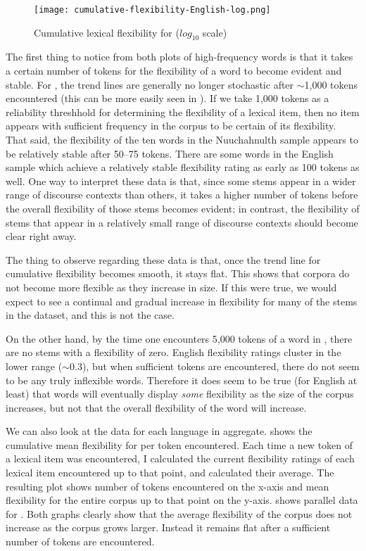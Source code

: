 \begin{figure}[h!]
  \centering
  \caption{Cumulative lexical flexibility for  ($log_10$ scale)}
  \label{fig:cumulative-flexibility-English-log}
  \texttt{[image: cumulative-flexibility-English-log.png]}
\end{figure}

The first thing to notice from both plots of high-frequency words is that it takes a certain number of tokens for the flexibility of a word to become evident and stable. For , the trend lines are generally no longer stochastic after $\sim$1,000 tokens encountered (this can be more easily seen in ). If we take 1,000 tokens as a reliability threshhold for determining the flexibility of a lexical item, then no  item appears with sufficient frequency in the corpus to be certain of its flexibility. That said, the flexibility of the ten words in the Nuuchahnulth sample appears to be relatively stable after 50–75 tokens. There are some words in the English sample which achieve a relatively stable flexibility rating as early as 100 tokens as well. One way to interpret these data is that, since some stems appear in a wider range of discourse contexts than others, it takes a higher number of tokens before the overall flexibility of those stems becomes evident; in contrast, the flexibility of stems that appear in a relatively small range of discourse contexts should become clear right away.

The thing to observe regarding these data is that, once the trend line for cumulative flexibility becomes smooth, it stays flat. This shows that corpora do not become more flexible as they increase in size. If this were true, we would expect to see a continual and gradual increase in flexibility for many of the stems in the dataset, and this is not the case.

On the other hand, by the time one encounters 5,000 tokens of a word in , there are no stems with a flexibility of zero. English flexibility ratings cluster in the lower range ($\sim0.3$), but when sufficient tokens are encountered, there do not seem to be any truly inflexible words. Therefore it does seem to be true (for English at least) that words will eventually display \emph{some} flexibility as the size of the corpus increases, but not that the overall flexibility of the word will increase.

We can also look at the data for each language in aggregate.  shows the cumulative mean flexibility for  per token encountered. Each time a new token of a lexical item was encountered, I calculated the current flexibility ratings of each lexical item encountered up to that point, and calculated their average. The resulting plot shows number of tokens encountered on the x-axis and mean flexibility for the entire corpus up to that point on the y-axis.  shows parallel data for . Both graphs clearly show that the average flexibility of the corpus does not increase as the corpus grows larger. Instead it remains flat after a sufficient number of tokens are encountered.

